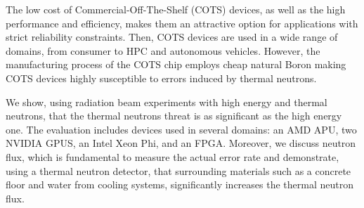 The low cost of Commercial-Off-The-Shelf (COTS) devices, as well as the high performance and efficiency, makes them an attractive option for applications with strict reliability constraints. Then, COTS devices are used in a wide range of domains, from consumer to HPC and autonomous vehicles. However, the manufacturing process of the COTS chip employs cheap natural Boron making COTS devices highly susceptible to errors induced by thermal neutrons.

We show, using radiation beam experiments with high energy and thermal neutrons, that the thermal neutrons threat is as significant as the high energy one. The evaluation includes devices used in several domains: an AMD APU, two NVIDIA GPUS, an Intel Xeon Phi, and an FPGA. Moreover, we discuss neutron flux, which is fundamental to measure the actual error rate and demonstrate, using a thermal neutron detector, that surrounding materials such as a concrete floor and water from cooling systems, significantly increases the thermal neutron flux.

% 


